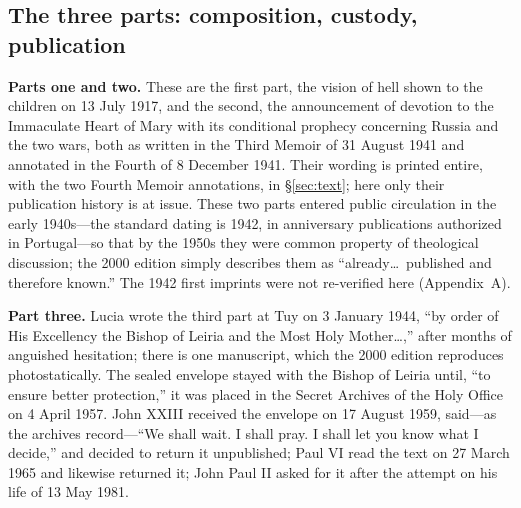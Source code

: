 \subsection{The three parts: composition, custody, publication}

\textbf{Parts one and two.} These are the first part, the vision of
hell shown to the children on 13 July 1917, and the second, the
announcement of devotion to the Immaculate Heart of Mary with its
conditional prophecy concerning Russia and the two wars, both as
written in the Third Memoir of 31 August 1941 and annotated in the
Fourth of 8 December 1941. Their wording is printed entire, with the
two Fourth Memoir annotations, in \S\ref{sec:text}; here only their
publication history is at issue. These two parts entered public
circulation in the early 1940s---the standard dating is 1942, in
anniversary publications authorized in Portugal---so that by the
1950s they were common property of theological discussion; the 2000
edition simply describes them as ``already\ldots\ published and
therefore known.'' The 1942 first imprints were not re-verified here
(Appendix~A).

\textbf{Part three.} Lucia wrote the third part at Tuy on 3 January
1944, ``by order of His Excellency the Bishop of Leiria and the Most
Holy Mother\ldots,'' after months of anguished hesitation; there is
one manuscript, which the 2000 edition reproduces photostatically.
The sealed envelope stayed with the Bishop of Leiria until, ``to
ensure better protection,'' it was placed in the Secret Archives of
the Holy Office on 4 April 1957. John XXIII received the envelope on
17 August 1959, said---as the archives record---``We shall wait. I
shall pray. I shall let you know what I decide,'' and decided to
return it unpublished; Paul VI read the text on 27 March 1965 and
likewise returned it; John Paul II asked for it after the attempt on
his life of 13 May 1981.

